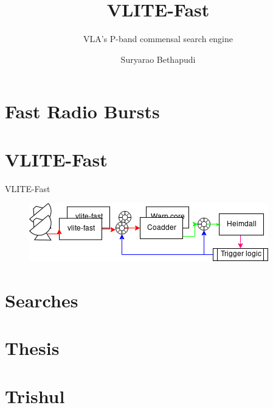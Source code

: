 \documentclass{beamer}
\title{VLITE-Fast} %
\subtitle{VLA's P-band commensal search engine} %
\author{Suryarao Bethapudi}
\begin{document}
\frame{\maketitle}



\section{Fast Radio Bursts}


\section{VLITE-Fast}
\begin{frame}{VLITE-Fast}
\begin{figure}
	\includegraphics[width=\textwidth,keepaspectratio]{vf_full.png}
\end{figure}
\end{frame}



\section{Searches}


\section{Thesis}


\section{Trishul}

\end{document}
